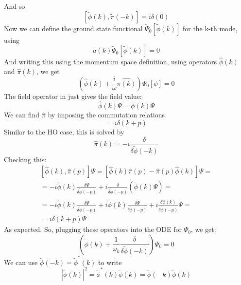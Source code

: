 \documentclass{article}
\begin{document}
And so
\begin{equation}
    \left[\tilde{\phi}(k),\tilde{\pi}(-k)\right] = i\delta(0)
\end{equation}
Now we can define the ground state functional $\tilde{\Psi}_0[\tilde{\phi}(k)]$ for the k-th mode, using
\begin{equation}
    a(k)\tilde{\Psi}_0[\tilde{\phi}(k)] = 0
\end{equation}
And writing this using the momentum space definition, using operators $\hat{\phi}(k)$ and $\hat{\pi}(k)$, we get
\begin{equation}
    \left(\hat{\phi}(k) + \frac{i}{\omega}\hat{\pi(k)}\right) \Psi_0[\phi] = 0
\end{equation}
The field operator in just gives the field value:
\begin{equation}
    \hat{\phi}(k) \Psi = \tilde{\phi}(k) \Psi
\end{equation}
We can find $\hat{\pi}$ by imposing the commutation relations
\begin{equation}
    [\hat{\phi}(k), \hat{\pi}(p)] = i\delta(k + p)
\end{equation}
Similar to the HO case, this is solved by
\begin{equation}
    \hat{\pi}(k) = -i\frac{\delta}{\delta \tilde{\phi}(-k)}
\end{equation}
Checking this:
\begin{equation}
\begin{gathered}
    [\hat{\phi}(k), \hat{\pi}(p)]\Psi =
    [\hat{\phi}(k)\hat{\pi}(p) - \hat{\pi}(p)\hat{\phi}(k)]\Psi = \\ =
    -i\tilde{\phi}(k)\frac{\delta \Psi}{\delta \tilde{\phi}(-p)} + i\frac{\delta}{\delta \tilde{\phi}(-p)}(\tilde{\phi}(k)\Psi) = \\ =
    -i\tilde{\phi}(k)\frac{\delta \Psi}{\delta \tilde{\phi}(-p)} + i\tilde{\phi}(k)\frac{\delta \Psi}{\delta \tilde{\phi}(-p)} + i\frac{\delta \tilde{\phi}(k)}{\delta \tilde{\phi}(-p)}\Psi = \\ =
    i\delta(k + p)\Psi
\end{gathered}
\end{equation}
As expected. So, plugging these operators into the ODE for $\Psi_0$, we get:
\begin{equation}
    \left(\tilde{\phi}(k) + \frac{1}{\omega_k}\frac{\delta}{\delta \tilde{\phi}(-k)}\right) \Psi_0 = 0
\end{equation}
We can use $\tilde{\phi}(-k) = \tilde{\phi}^*(k)$ to write
\begin{equation}
    \left|\tilde{\phi}(k)\right|^2 = \tilde{\phi}^*(k)\tilde{\phi}(k) = \tilde{\phi}(-k)\tilde{\phi}(k)
\end{equation}
\end{document}
